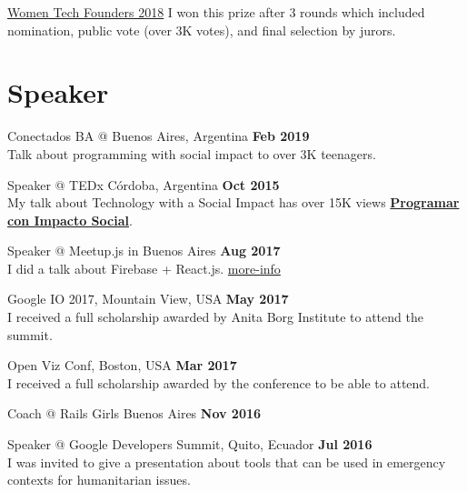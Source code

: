 \documentclass[margin,line]{resume}
\begin{document}
\begin{resume}
\begin{list2}
\item \href{https://womentechfounders.com/2018-award-winners/}{Women Tech Founders 2018} I won this prize after 3 rounds which included nomination, public vote (over 3K votes), and final selection by jurors.
\end{list2}


\section{\mysidestyle Speaker}

\begin{list2}

\item Conectados BA @ Buenos Aires, Argentina \hfill \textbf{Feb 2019}  \\
Talk about programming with social impact to over 3K teenagers.

\item Speaker @ TEDx C\'ordoba, Argentina \hfill \textbf{Oct 2015}  \\
My talk about Technology with a Social Impact has over 15K views \href{https://www.youtube.com/watch?v=0cx8UwdN-g4&t=1s}{\textbf{Programar con Impacto Social}}.


\item Speaker @ Meetup.js in Buenos Aires \hfill \textbf{Aug 2017}
\\
I did a talk about Firebase + React.js. \href{https://www.meetup.com/Meetup-js/events/242439836/?eventId=242439836}{more-info}

\item Google IO 2017, Mountain View, USA \hfill \textbf{May 2017}
\\
I received a full scholarship awarded by Anita Borg Institute to attend the summit.


\item Open Viz Conf, Boston, USA \hfill \textbf{Mar 2017}
\\ I received a full scholarship awarded by the conference to be able to attend.

\item Coach  @ Rails Girls Buenos Aires \hfill \textbf{Nov 2016}

\item Speaker @ Google Developers Summit, Quito, Ecuador \hfill \textbf{Jul 2016}  \\
I was invited to give a presentation about tools that can be used in emergency contexts for humanitarian issues.


\end{list2}
\end{resume}
\end{document}
